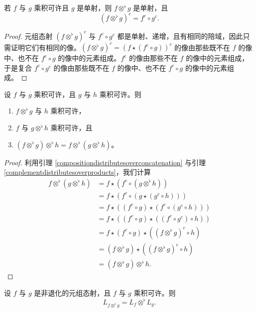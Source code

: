 \begin{lemma}\label{complementdistributesoverproducts}
    若 $f$ 与 $g$ 乘积可许且 $g$ 是单射，则 $f \otimes^\flat g$ 是单射，且
    \[
    (f \otimes^\flat g)^c = f^c \circ g^c.
    \]
\end{lemma}
\begin{proof}
    元组态射 $(f \otimes^\flat g)^c$ 与 $f^c \circ g^c$ 都是单射、递增，且有相同的陪域，因此只需证明它们有相同的像。$(f \otimes^\flat g)^c = (f \star (f^c \circ g) )^c$ 的像由那些既不在 $f$ 的像中、也不在 $f^c \circ g$ 的像中的元素组成。$f^c$ 的像由那些不在 $f$ 的像中的元素组成，于是复合 $f^c \circ g^c$ 的像由那些既不在 $f$ 的像中、也不在 $f^c \circ g$ 的像中的元素组成。
\end{proof}

\begin{proposition}
    设 $f$ 与 $g$ 乘积可许，且 $g$ 与 $h$ 乘积可许。则
    \begin{enumerate}
        \item $f \otimes^\flat g$ 与 $h$ 乘积可许，
        \item $f$ 与 $g \otimes^\flat h$ 乘积可许，且
        \item $(f \otimes^\flat g) \otimes^\flat h = f \otimes^\flat (g \otimes^\flat h)$。
    \end{enumerate}
\end{proposition}

\begin{proof}
    利用引理 \ref{compositiondistributesoverconcatenation} 与引理 \ref{complementdistributesoverproducts}，我们计算
    \begin{align*}
    f \otimes^\flat (g \otimes^\flat h) & = f \star (f^c \circ (g \otimes^\flat h))\\
    & = f \star (f^c \circ (g \star (g^c \circ h) ) )\\
    & = f \star ( (f^c \circ g) \star (f^c \circ (g^c \circ h) ) ) \\
    & = f \star ( (f^c \circ g) \star ((f^c \circ g^c) \circ h ) ) \\
    & = f \star (f^c \circ g) \star ( (f \otimes^\flat g)^c \circ h) \\
    & = (f \otimes^\flat g) \star ( (f \otimes^\flat g)^c \circ h) \\
    & = (f \otimes^\flat g) \otimes^\flat h.
    \end{align*}
\end{proof}



\begin{proposition}
    设 $f$ 与 $g$ 是非退化的元组态射，且 $f$ 与 $g$ 乘积可许。则
    \[
    L_{f \otimes^\flat g} = L_f \otimes^\flat L_g.
    \]
\end{proposition}

